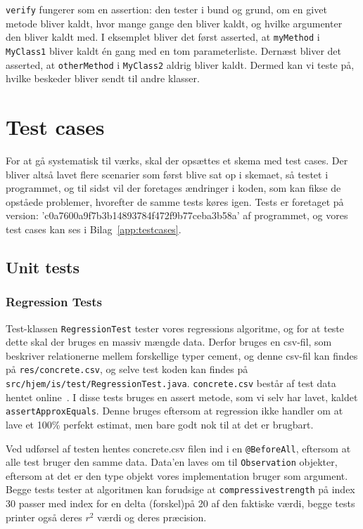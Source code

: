 \texttt{verify} fungerer som en assertion: den tester i bund og grund, om en givet metode bliver kaldt, hvor mange gange den bliver kaldt, og hvilke argumenter den bliver kaldt med. I eksemplet bliver det først asserted, at \texttt{myMethod} i \texttt{MyClass1} bliver kaldt én gang med en tom parameterliste. Dernæst bliver det asserted, at \texttt{otherMethod} i \texttt{MyClass2} aldrig bliver kaldt. Dermed kan vi teste på, hvilke beskeder bliver sendt til andre klasser.

\section{Test cases}
For at gå systematisk til værks, skal der opsættes et skema med test cases\cite{Heumann}. Der bliver altså lavet flere scenarier som først blive sat op i skemaet, så testet i programmet, og til sidst vil der foretages ændringer i koden, som kan fikse de opståede problemer, hvorefter de samme tests køres igen. Tests er foretaget på version: 'c0a7600a9f7b3b14893784f472f9b77ceba3b58a' af programmet, og vores test cases kan ses i Bilag~\ref{app:testcases}.

\subsection{Unit tests}
\subsubsection{Regression Tests}
Test-klassen \texttt{RegressionTest} tester vores regressions algoritme, og for at teste dette skal der bruges en massiv mængde data. Derfor bruges en csv-fil, som beskriver relationerne mellem forskellige typer cement, og denne csv-fil kan findes på \texttt{res/concrete.csv}, og selve test koden kan findes på \texttt{src/hjem/is/test/RegressionTest.java}. \texttt{concrete.csv} består af test data hentet online~\cite{ExampleSales}. I disse tests bruges en assert metode, som vi selv har lavet, kaldet \texttt{assertApproxEquals}. Denne bruges eftersom at regression ikke handler om at lave et 100\% perfekt estimat, men bare godt nok til at det er brugbart.

Ved udførsel af testen hentes concrete.csv filen ind i en \texttt{@BeforeAll}, eftersom at alle test bruger den samme data. Data'en laves om til \texttt{Observation} objekter, eftersom at det er den type objekt vores implementation bruger som argument. Begge tests tester at algoritmen kan forudsige at \texttt{compressivestrength} på index 30 passer med index for en delta (forskel)på 20 af den faktiske værdi, begge tests printer også deres $r^{2}$ værdi og deres præcision.

